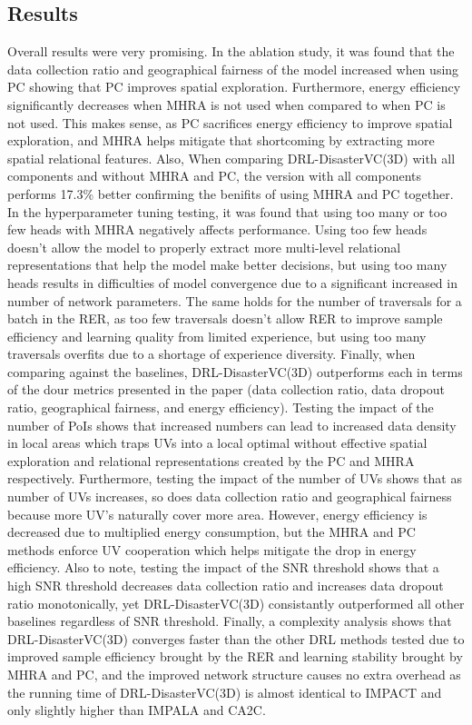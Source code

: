 \documentclass[sigconf, natbib=false]{acmart}
\begin{document}
   \subsection{Results}
   Overall results were very promising. In the ablation study, it was found that the data collection ratio and geographical fairness of the model increased when using PC showing that PC improves spatial exploration. Furthermore, energy efficiency significantly decreases when MHRA is not used when compared to when PC is not used. This makes sense, as PC sacrifices energy efficiency to improve spatial exploration, and MHRA helps mitigate that shortcoming by extracting more spatial relational features. Also, When comparing DRL-DisasterVC(3D) with all components and without MHRA and PC, the version with all components performs 17.3\% better confirming the benifits of using MHRA and PC together. In the hyperparameter tuning testing, it was found that using too many or too few heads with MHRA negatively affects performance. Using too few heads doesn't allow the model to properly extract more multi-level relational representations that help the model make better decisions, but using too many heads results in difficulties of model convergence due to a significant increased in number of network parameters. The same holds for the number of traversals for a batch in the RER, as  too few traversals doesn't allow RER to improve sample efficiency and learning quality from limited experience, but using too many traversals overfits due to a shortage of experience diversity. Finally, when comparing against the baselines, DRL-DisasterVC(3D) outperforms each in terms of the dour metrics presented in the paper (data collection ratio, data dropout ratio, geographical fairness, and energy efficiency). Testing the impact of the number of PoIs shows that increased numbers can lead to increased data density in local areas which traps UVs into a local optimal without effective spatial exploration and relational representations created by the PC and MHRA respectively. Furthermore, testing the impact of the number of UVs shows that as number of UVs increases, so does data collection ratio and geographical fairness because more UV's naturally cover more area. However, energy efficiency is decreased due to multiplied energy consumption, but the MHRA and PC methods enforce UV cooperation which helps mitigate the drop in energy efficiency. Also to note, testing the impact of the SNR threshold shows that a high SNR threshold decreases data collection ratio and increases data dropout ratio monotonically, yet DRL-DisasterVC(3D) consistantly outperformed all other baselines regardless of SNR threshold. Finally, a complexity analysis shows that DRL-DisasterVC(3D) converges faster than the other DRL methods tested due to improved sample efficiency brought by the RER and learning stability brought by MHRA and PC, and the improved network structure causes no extra overhead as the running time of DRL-DisasterVC(3D) is almost identical to IMPACT and only slightly higher than IMPALA and CA2C.
   
\end{document}
